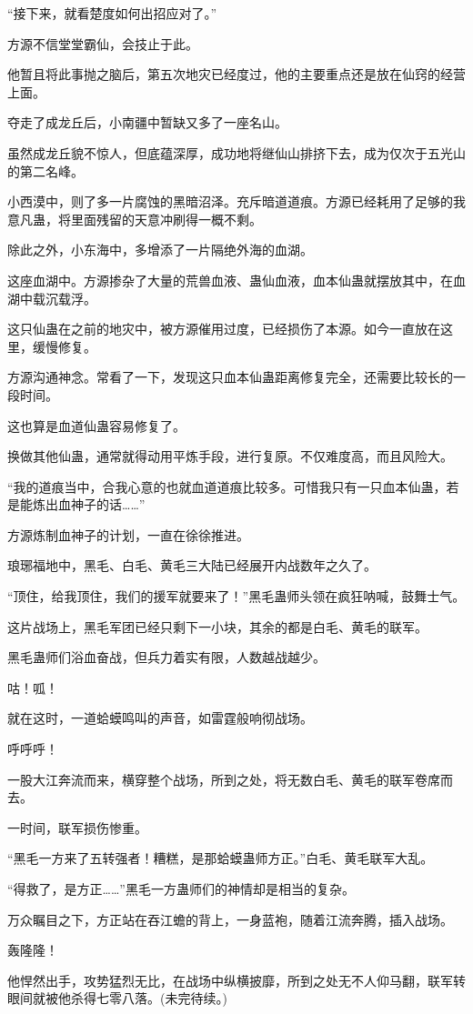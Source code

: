 \begin{this_body}
“接下来，就看楚度如何出招应对了。”

方源不信堂堂霸仙，会技止于此。

他暂且将此事抛之脑后，第五次地灾已经度过，他的主要重点还是放在仙窍的经营上面。

夺走了成龙丘后，小南疆中暂缺又多了一座名山。

虽然成龙丘貌不惊人，但底蕴深厚，成功地将继仙山排挤下去，成为仅次于五光山的第二名峰。

小西漠中，则了多一片腐蚀的黑暗沼泽。充斥暗道道痕。方源已经耗用了足够的我意凡蛊，将里面残留的天意冲刷得一概不剩。

除此之外，小东海中，多增添了一片隔绝外海的血湖。

这座血湖中。方源掺杂了大量的荒兽血液、蛊仙血液，血本仙蛊就摆放其中，在血湖中载沉载浮。

这只仙蛊在之前的地灾中，被方源催用过度，已经损伤了本源。如今一直放在这里，缓慢修复。

方源沟通神念。常看了一下，发现这只血本仙蛊距离修复完全，还需要比较长的一段时间。

这也算是血道仙蛊容易修复了。

换做其他仙蛊，通常就得动用平炼手段，进行复原。不仅难度高，而且风险大。

“我的道痕当中，合我心意的也就血道道痕比较多。可惜我只有一只血本仙蛊，若是能炼出血神子的话……”

方源炼制血神子的计划，一直在徐徐推进。

琅琊福地中，黑毛、白毛、黄毛三大陆已经展开内战数年之久了。

“顶住，给我顶住，我们的援军就要来了！”黑毛蛊师头领在疯狂呐喊，鼓舞士气。

这片战场上，黑毛军团已经只剩下一小块，其余的都是白毛、黄毛的联军。

黑毛蛊师们浴血奋战，但兵力着实有限，人数越战越少。

咕！呱！

就在这时，一道蛤蟆鸣叫的声音，如雷霆般响彻战场。

呼呼呼！

一股大江奔流而来，横穿整个战场，所到之处，将无数白毛、黄毛的联军卷席而去。

一时间，联军损伤惨重。

“黑毛一方来了五转强者！糟糕，是那蛤蟆蛊师方正。”白毛、黄毛联军大乱。

“得救了，是方正……”黑毛一方蛊师们的神情却是相当的复杂。

万众瞩目之下，方正站在吞江蟾的背上，一身蓝袍，随着江流奔腾，插入战场。

轰隆隆！

他悍然出手，攻势猛烈无比，在战场中纵横披靡，所到之处无不人仰马翻，联军转眼间就被他杀得七零八落。(未完待续。)

\end{this_body}

